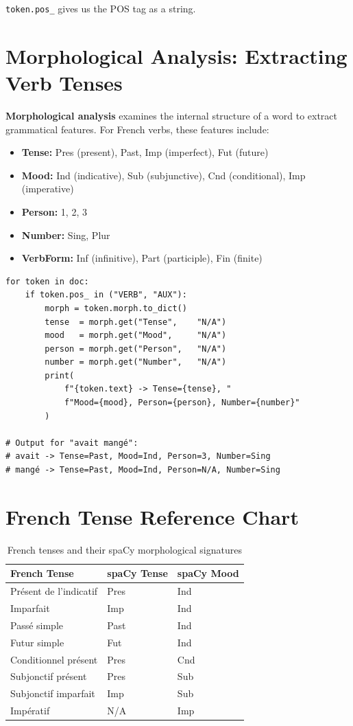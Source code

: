 \documentclass[12pt,oneside]{book}
\begin{document}
\texttt{token.pos\_} gives us the POS tag as a string.

\section{Morphological Analysis: Extracting Verb Tenses}

\textbf{Morphological analysis} examines the internal structure of a word to extract
grammatical features. For French verbs, these features include:

\begin{itemize}
  \item \textbf{Tense:} Pres (present), Past, Imp (imperfect), Fut (future)
  \item \textbf{Mood:} Ind (indicative), Sub (subjunctive), Cnd (conditional), Imp (imperative)
  \item \textbf{Person:} 1, 2, 3
  \item \textbf{Number:} Sing, Plur
  \item \textbf{VerbForm:} Inf (infinitive), Part (participle), Fin (finite)
\end{itemize}

\begin{lstlisting}[caption={Extracting morphological features from a verb (LLR-15)}]
for token in doc:
    if token.pos_ in ("VERB", "AUX"):
        morph = token.morph.to_dict()
        tense  = morph.get("Tense",    "N/A")
        mood   = morph.get("Mood",     "N/A")
        person = morph.get("Person",   "N/A")
        number = morph.get("Number",   "N/A")
        print(
            f"{token.text} -> Tense={tense}, "
            f"Mood={mood}, Person={person}, Number={number}"
        )

# Output for "avait mangé":
# avait -> Tense=Past, Mood=Ind, Person=3, Number=Sing
# mangé -> Tense=Past, Mood=Ind, Person=N/A, Number=Sing
\end{lstlisting}

\section{French Tense Reference Chart}

\begin{table}[H]
\centering
\caption{French tenses and their spaCy morphological signatures}
\begin{tabularx}{\textwidth}{l l l}
\toprule
\textbf{French Tense} & \textbf{spaCy Tense} & \textbf{spaCy Mood} \\
\midrule
Présent de l'indicatif & Pres & Ind \\
Imparfait & Imp & Ind \\
Passé simple & Past & Ind \\
Futur simple & Fut & Ind \\
Conditionnel présent & Pres & Cnd \\
Subjonctif présent & Pres & Sub \\
Subjonctif imparfait & Imp & Sub \\
Impératif & N/A & Imp \\
\bottomrule
\end{tabularx}
\end{table}
\end{document}
